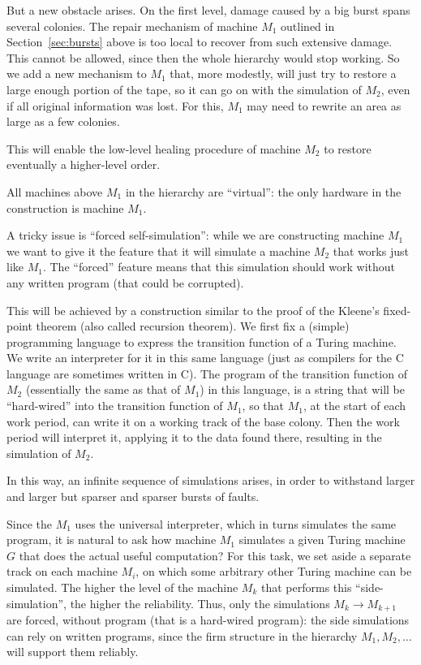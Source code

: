 \documentclass[12pt]{memoir}
\begin{document}
But a new obstacle arises.
On the first level, damage caused by a big burst spans several colonies.
The repair mechanism of machine \( M_1 \) outlined in Section~\ref{sec:bursts} above 
is too local to recover from such extensive damage.
This cannot be allowed, since then the whole hierarchy would stop working.
So we add a new mechanism to \( M_{1} \) that, more modestly,
will just try to restore a large enough portion of the
tape, so it can go on with the simulation of \( M_2 \), even if all 
original information was lost.
For this, \( M_{1} \) may need to rewrite an area as large as a few colonies.

This will enable the low-level healing procedure of 
machine \( M_{2} \) to restore eventually a higher-level order.

All machines above \( M_1 \) in the hierarchy are
``virtual'': the only hardware in the construction is machine \( M_1 \).

A tricky issue is ``forced self-simulation'': while we are constructing machine \( M_1 \)
we want to give it the feature that it will simulate a machine \( M_{2} \) that
works just like \( M_{1} \).
The ``forced'' feature means that this simulation should
work without any written program (that could be corrupted).

This will be achieved by
a construction similar to the proof of the Kleene's fixed-point 
theorem (also called recursion theorem).
We first fix a (simple) programming language to express the transition
function of a Turing machine.
We write an interpreter for it in this same language (just as compilers for the 
C language are sometimes written in C).
The program of the transition function of \( M_{2} \)
(essentially the same as that of \( M_{1} \))
in this language, is a string that will be
``hard-wired'' into the transition function of \( M_{1} \), 
so that \( M_{1} \), at the start of each work period, can write
it on a working track of the base colony.
Then the work period will interpret it, 
applying it to the data found there, resulting
in the simulation of \( M_{2} \).

In this way, an infinite sequence of simulations arises, in order
to withstand larger and larger but sparser and sparser bursts of faults.

Since the \( M_1 \) uses the universal interpreter, which in turns
simulates the same program, it is natural to ask
how  machine \( M_1 \) simulates a given Turing machine \( G \) that does the 
actual useful computation?
For this task, we set aside a separate track 
on each machine \( M_i \), on which some arbitrary other Turing machine can be
simulated.
The higher the level of the machine \( M_{k} \) that performs this
``side-simulation'', the higher the reliability.
Thus, only the simulations \( M_{k}\to M_{k+1} \) are forced, without program
(that is a hard-wired program):
the side simulations can rely on written programs, since the firm
structure in the hierarchy \( M_{1},M_{2},\dots \) will support them reliably.
\end{document}
